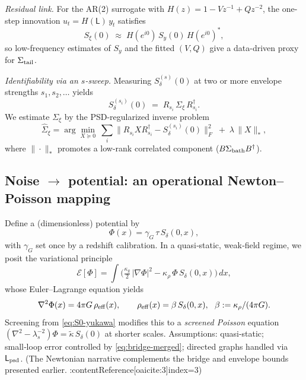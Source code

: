 \documentclass[11pt]{article}
\begin{document}
\emph{Residual link.} For the AR(2) surrogate with $H(z)=1-Vz^{-1}+Qz^{-2}$, the one-step
innovation $u_t=H(\mathsf{L})\,y_t$ satisfies
\[
S_\xi(0)\;\approx\;H(e^{i0})\,S_y(0)\,H(e^{i0})^\ast,
\]
so low-frequency estimates of $S_y$ and the fitted $(V,Q)$ give a data-driven proxy for $\Sigma_{\rm tail}$.

\emph{Identifiability via an $s$-sweep.} Measuring $S_\delta^{(s)}(0)$ at two or more envelope strengths
$s_1,s_2,\dots$ yields
\[
S_\delta^{(s_i)}(0)\;=\;R_{s_i}\,\Sigma_\xi\,R_{s_i}^\dagger.
\]
We estimate $\Sigma_\xi$ by the PSD-regularized inverse problem
\[
\widehat{\Sigma}_\xi=\arg\min_{X\succeq0}\ \sum_i\big\|R_{s_i}XR_{s_i}^\dagger-S_\delta^{(s_i)}(0)\big\|_F^2
\;+\;\lambda\,\|X\|_{\ast},
\]
where $\|\cdot\|_{\ast}$ promotes a low-rank correlated component ($B\Sigma_{\rm bath}B^\dagger$).

\subsection{Noise \texorpdfstring{$\to$}{to} potential: an operational Newton--Poisson mapping}
\label{subsec:noise-poisson}
Define a (dimensionless) potential by
\begin{equation}
\Phi(x)=\gamma_G\,\tau\,S_\delta(0,x),
\label{eq:phi-constitutive}
\end{equation}
with \(\gamma_G\) set once by a redshift calibration. In a quasi‑static, weak‑field regime, we posit the
variational principle
\[
\mathcal E[\Phi]=\int \Big(\tfrac{\kappa_g}{2}\,|\nabla\Phi|^2-\kappa_\rho\,\Phi\,S_\delta(0,x)\Big)\,dx,
\]
whose Euler–Lagrange equation yields
\begin{equation}
\nabla^2\Phi(x)=4\pi G\,\rho_{\rm eff}(x),\qquad
\rho_{\rm eff}(x)=\beta\,S_\delta(0,x),\ \ \beta:=\kappa_\rho/(4\pi G).
\label{eq:poisson-noise}
\end{equation}
Screening from \eqref{eq:S0-yukawa} modifies this to a \emph{screened Poisson} equation
\((\nabla^2-\lambda_s^{-2})\Phi=\tilde\kappa\,S_\delta(0)\) at shorter scales. Assumptions: quasi‑static;
small‑loop error controlled by \eqref{eq:bridge-merged}; directed graphs handled via \(\mathsf{L}_{\rm psd}\).
(The Newtonian narrative complements the bridge and envelope bounds presented earlier. :contentReference[oaicite:3]{index=3})
\end{document}
